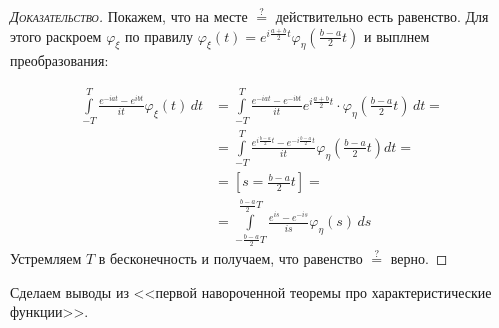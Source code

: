 \documentclass[../main.tex]{subfiles}
\begin{document}
\begin{proof}[\normalfont\textsc{Доказательство}]
 Покажем, что на месте $\overset{?}{=}$ действительно есть равенство. Для этого раскроем $\varphi_{\xi} $ по правилу $\varphi_\xi(t) = e^{i \frac{a+b}{2}t}\varphi_\eta\left(\frac{b-a}{2}t\right)$ и выплнем преобразования:	

 \begin{align*}
  \int\limits_{-T}^{T} \frac{e^{-iat} - e^{ibt}}{it} \varphi_{\xi}(t)\,dt &= \int\limits_{-T}^{T} \frac{e^{-iat}-e^{-ibt}}{it}e^{i \frac{a+b}{2} t} \cdot \varphi_\eta \left( \frac{b-a}{2}t \right)\,dt = \\
  &= \int\limits_{-T}^{T} \frac{e^{i \frac{b-a}{2}t} -e^{-i \frac{b-a}{2} t}}{it} \varphi_\eta \left( \frac{b-a}{2}t \right)dt = \\
  &= \left[s = \frac{b - a}{2} t\right] = \\
  &= \int\limits_{- \frac{b-a}{2}T}^{\frac{b-a}{2}T} \frac{e^{is}-e^{-is}}{is}\varphi_\eta(s)\,ds 
 \end{align*}
 Устремляем $T$ в бесконечность и получаем, что равенство $\overset{?}{=}$ верно.
\end{proof}

Сделаем выводы из <<первой навороченной теоремы про характеристические функции>>.
\end{document}
